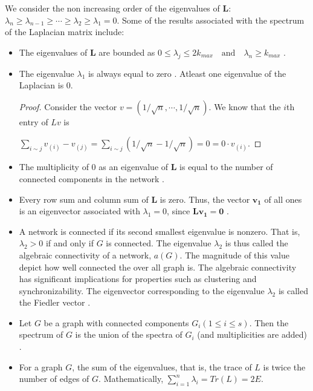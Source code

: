 \documentclass[10pt,a4paper]{article}
\begin{document}
We consider the non increasing order of the eigenvalues of $\mathbf{L}$: $\lambda_n  \geq \lambda_{n-1} \geq  \cdots \geq \lambda_2 \geq \lambda_1 =0 $. Some of the results associated with the spectrum of the Laplacian matrix include:
\begin{itemize}
	\item The eigenvalues of $\mathbf{L}$ are bounded as 
	$ 0 \leq \lambda_j \leq 2k_{max} \quad \text{and} \quad \lambda_n \geq k_{max} $ \citep{estrada2011structure}.
	\item The eigenvalue $\lambda_1$ is always equal to zero \citep{estrada2011structure}. Atleast one eigenvalue of the Laplacian is $0$.
	\begin{proof}
		Consider the vector $v= (1/\sqrt{n}, \cdots, 1/\sqrt{n}) $. We know that the $i$th entry of $Lv$ is 
		
		$\sum_{i\sim j} v_{(i)}- v_{(j)} = \sum_{i\sim j} (1/\sqrt{n} - 1/\sqrt{n}) = 0 = 0 \cdot v_{(i)}$.
	\end{proof}
	\item The multiplicity of $0$ as an eigenvalue of $\mathbf{L}$ is equal to the number of connected components in the network \citep{estrada2011structure}.
	\item Every row sum and column sum of $\mathbf{L}$ is zero. Thus, the vector $\mathbf{v_1}$ of all ones is an eigenvector associated with $\lambda_1 =0$, since $\mathbf{Lv_1} = \mathbf{0} $ \citep{das2004laplacian}.
	\item  A network is connected if its second smallest eigenvalue is nonzero. That is, $\lambda_2> 0$ if and only if $G$ is connected. The eigenvalue $\lambda_2$ is thus called the algebraic connectivity of a network, $a(G)$. The magnitude of this value depict how well connected  the over all graph is. The algebraic connectivity has significant implications for properties such as clustering and synchronizability.
	The eigenvector corresponding to the eigenvalue $\lambda_2$ is called the Fiedler vector \citep{estrada2015first}.
	
	\item Let $G$ be a graph with connected components $G_i (1 \leq i \leq s)$. Then the spectrum of $G$ is the union of the spectra of $G_i$ (and multiplicities are added) \citep{brouwer2011spectra}.
	
	\item For a graph $G$, the sum of the eigenvalues, that is, the trace of $L$ is twice the number of edges of $G$. Mathematically, $\sum_{i=1}^n \lambda_i = Tr(L) = 2E.$ \citep{brouwer2011spectra}\\
	
\end{itemize}
\end{document}
